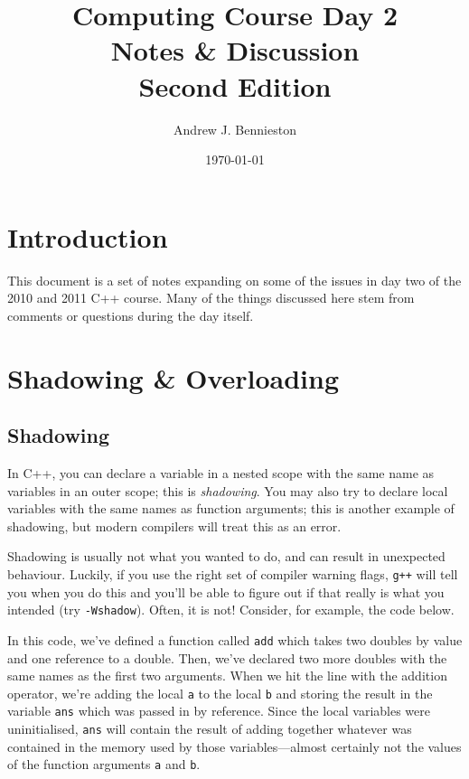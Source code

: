 \documentclass[a4paper]{scrartcl}
\title{Computing Course Day 2\\
Notes \& Discussion\\
Second Edition}
\author{Andrew J. Bennieston}
\date{\today}
\begin{document}
\maketitle

\tableofcontents

\pagebreak

\section{Introduction}
This document is a set of notes expanding on some of the issues in day two of the 2010 and 2011 C++ course. Many of the things discussed here stem from comments or questions during the day itself.

\section{Shadowing \& Overloading}
\subsection{Shadowing}
In C++, you can declare a variable in a nested scope with the same name as variables in an outer scope; this is \emph{shadowing}. You may also try to declare local variables with the same names as function arguments; this is another example of shadowing, but modern compilers will treat this as an error.

Shadowing is usually not what you wanted to do, and can result in unexpected behaviour. Luckily, if you use the right set of compiler warning flags, \verb|g++| will tell you when you do this and you'll be able to figure out if that really is what you intended (try \texttt{-Wshadow}). Often, it is not! Consider, for example, the code below.



In this code, we've defined a function called \verb|add| which takes two doubles by value and one reference to a double. Then, we've declared two more doubles with the same names as the first two arguments. When we hit the line with the addition operator, we're adding the local \verb|a| to the local \verb|b| and storing the result in the variable \verb|ans| which was passed in by reference. Since the local variables were uninitialised, \verb|ans| will contain the result of adding together whatever was contained in the memory used by those variables---almost certainly not the values of the function arguments \verb|a| and \verb|b|.
\end{document}
